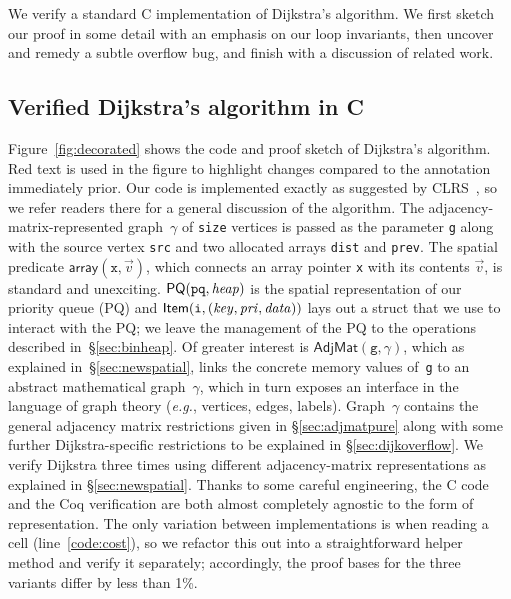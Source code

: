 We verify a standard C implementation of Dijkstra's algorithm.
We first sketch our proof in some detail with an emphasis on our loop invariants,
then uncover and remedy a subtle overflow bug, and finish with a discussion
of related work.

\vspace*{-0.25em}
\subsection{Verified Dijkstra's algorithm in C}
\label{sec:dijkoverview}
\vspace*{-0.25em}

Figure~\ref{fig:decorated} shows the code and proof
sketch of Dijkstra's algorithm.
{\color{red}Red} text is used in the figure to highlight changes compared to the
annotation immediately prior.
Our code is implemented exactly
as suggested by CLRS~\cite{clrs}, so we refer readers there for a
general discussion of the algorithm.
The adjacency-matrix-represented graph~$\gamma$ of \texttt{size} vertices
is passed as the parameter \texttt{g} along with the source vertex \texttt{src}
and two allocated arrays \texttt{dist} and \texttt{prev}.
The spatial predicate $\mathsf{array}(\texttt{x},\vec{v})$, which connects
an array pointer \texttt{x} with its contents $\vec{v}$, is standard and unexciting.
$\mathsf{PQ}(\texttt{pq},\mathit{heap})$ is the spatial
representation of our priority queue (PQ) and
$\mathsf{Item}(\texttt{i},\mathit{(key, pri, data)})$
lays out a struct that we use to interact with the PQ;
we leave the management of the PQ to the operations described in~\S\ref{sec:binheap}.
Of greater interest is $\mathsf{AdjMat}(\texttt{g},\gamma)$, which as explained in~\S\ref{sec:newspatial}, links
the concrete memory values of~\texttt{g} to an abstract mathematical
graph~$\gamma$, which in turn exposes an interface in the
language of graph theory (\emph{e.g.}, vertices, edges, labels).  Graph~$\gamma$ contains
the general adjacency matrix restrictions given in \S\ref{sec:adjmatpure} along with some further
Dijkstra-specific restrictions to be explained in \S\ref{sec:dijkoverflow}.
We verify Dijkstra
three times using different adjacency-matrix representations as explained in \S\ref{sec:newspatial}.
Thanks to some careful engineering, the C code and
the Coq verification are both almost completely agnostic to
the form of representation. The only variation between implementations
is when reading a cell (line~\ref{code:cost}), so we
refactor this out into a straightforward helper method and
verify it separately; accordingly, the proof bases for the three variants differ by less than 1\%.

